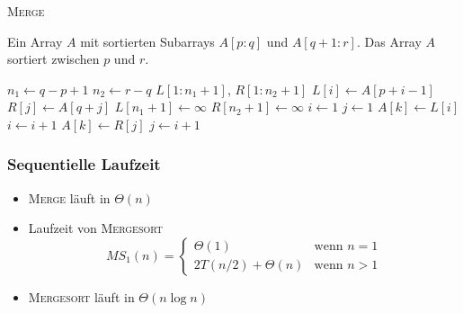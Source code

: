 \begin{frame}
    \begin{algorithm}[H]
        \caption{{\rmfamily \textsc{Merge}} \cite[S.31]{cormen}}
        \label{alg:merge}
        \begin{algorithmic}[1]
            \Require Ein Array $A$ mit sortierten Subarrays $A[p:q]$ und
                $A[q+1:r]$.
            \Ensure Das Array $A$ sortiert zwischen $p$ und $r$.
            \setlength\multicolsep{0pt}
            \begin{multicols}{2}
                \State $n_1 \gets q - p + 1$
                \State $n_2 \gets r - q$
                \State $L[1:n_1 +1]$, $R[1:n_2 + 1]$
                    \State $L[i] \gets A[p + i - 1]$
                \EndFor
                    \State $R[j] \gets A[q + j]$
                \EndFor
                \State $L[n_1 + 1] \gets \infty$
                \State $R[n_2 + 1] \gets \infty$
                \State $i \gets 1$
                \State $j \gets 1$
                        \State $A[k] \gets L[i]$
                        \State $i \gets i + 1$
                    \Else
                        \State $A[k] \gets R[j]$
                        \State $j \gets i + 1$
                    \EndIf
                \EndFor
            \end{multicols}
        \end{algorithmic}
    \end{algorithm}
\end{frame}

\begin{frame}
    \frametitle{Sequentielle Laufzeit}
    \begin{itemize}
        \item {\rmfamily \textsc{Merge}} läuft in $\Theta(n)$
        \item Laufzeit von {\rmfamily \textsc{Mergesort}}
            \begin{equation}
                MS_1(n) = \begin{cases}
                    \Theta(1) & \text{wenn } n = 1 \\
                    2T(n/2) + \Theta(n) & \text{wenn } n > 1
                \end{cases}
            \end{equation}
        \item {\rmfamily \textsc{Mergesort}} läuft in $\Theta(n \log n)$
    \end{itemize}
\end{frame}

